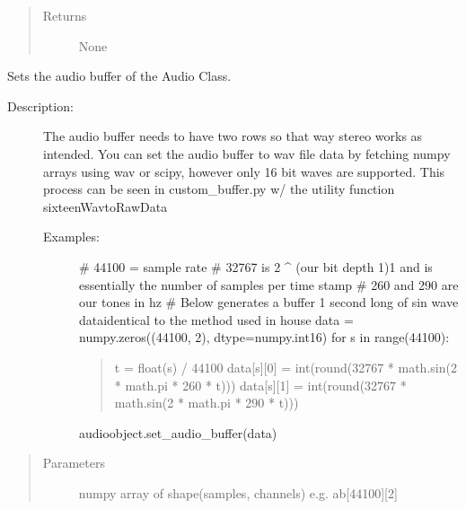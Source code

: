 \documentclass[letterpaper,10pt,english,openany,oneside]{sphinxmanual}
\begin{document}
\begin{fulllineitems}
\begin{fulllineitems}
\begin{quote}
\begin{description}
\item[{Returns}] \leavevmode
\sphinxAtStartPar
None

\end{description}\end{quote}

\end{fulllineitems}



\begin{fulllineitems}
\sphinxAtStartPar
Sets the audio buffer of the Audio Class.
\begin{description}
\item[{Description:}] \leavevmode
\sphinxAtStartPar
The audio buffer needs to have two rows so that way stereo works as intended.
You can set the audio buffer to wav file data by fetching numpy arrays using wav or scipy,
however only 16 bit waves are supported. This process can be seen in custom\_buffer.py w/ the
utility function sixteenWavtoRawData
\begin{description}
\item[{Examples:}] \leavevmode
\sphinxAtStartPar
\# 44100 = sample rate
\# 32767 is 2 \textasciicircum{} (our bit depth \sphinxhyphen{}1)\sphinxhyphen{}1 and is essentially the number of samples per time stamp
\# 260 and 290 are our tones in hz
\# Below generates a buffer 1 second long of sin wave data\sphinxhyphen{}identical to the method used in house
data = numpy.zeros((44100, 2), dtype=numpy.int16)
for s in range(44100):
\begin{quote}

\sphinxAtStartPar
t = float(s) / 44100
data{[}s{]}{[}0{]} = int(round(32767 * math.sin(2 * math.pi * 260 * t)))
data{[}s{]}{[}1{]} = int(round(32767 * math.sin(2 * math.pi * 290 * t)))
\end{quote}

\sphinxAtStartPar
audioobject.set\_audio\_buffer(data)

\end{description}

\end{description}
\begin{quote}\begin{description}
\item[{Parameters}] \leavevmode
\sphinxAtStartPar
{} \textendash{} numpy array of shape(samples, channels) e.g. ab{[}44100{]}{[}2{]}


\end{description}
\end{quote}
\end{fulllineitems}
\end{fulllineitems}
\end{document}

